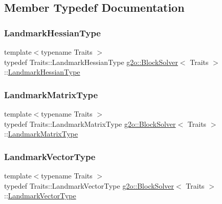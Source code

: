 \subsection{Member Typedef Documentation}
\mbox{\label{classg2o_1_1_block_solver_a465b1252905d90fd69b4243716620c45}} 
\subsubsection{\texorpdfstring{Landmark\+Hessian\+Type}{LandmarkHessianType}}
{\footnotesize\ttfamily template$<$typename Traits $>$ \\
typedef Traits\+::\+Landmark\+Hessian\+Type \mbox{\hyperlink{classg2o_1_1_block_solver}{g2o\+::\+Block\+Solver}}$<$ Traits $>$\+::\mbox{\hyperlink{classg2o_1_1_block_solver_a465b1252905d90fd69b4243716620c45}{Landmark\+Hessian\+Type}}}

\mbox{\label{classg2o_1_1_block_solver_afd898a666343291129d37a979e23ded6}} 
\subsubsection{\texorpdfstring{Landmark\+Matrix\+Type}{LandmarkMatrixType}}
{\footnotesize\ttfamily template$<$typename Traits $>$ \\
typedef Traits\+::\+Landmark\+Matrix\+Type \mbox{\hyperlink{classg2o_1_1_block_solver}{g2o\+::\+Block\+Solver}}$<$ Traits $>$\+::\mbox{\hyperlink{classg2o_1_1_block_solver_afd898a666343291129d37a979e23ded6}{Landmark\+Matrix\+Type}}}

\mbox{\label{classg2o_1_1_block_solver_a19ade5e432f32e46557192ae75074304}} 
\subsubsection{\texorpdfstring{Landmark\+Vector\+Type}{LandmarkVectorType}}
{\footnotesize\ttfamily template$<$typename Traits $>$ \\
typedef Traits\+::\+Landmark\+Vector\+Type \mbox{\hyperlink{classg2o_1_1_block_solver}{g2o\+::\+Block\+Solver}}$<$ Traits $>$\+::\mbox{\hyperlink{classg2o_1_1_block_solver_a19ade5e432f32e46557192ae75074304}{Landmark\+Vector\+Type}}}

